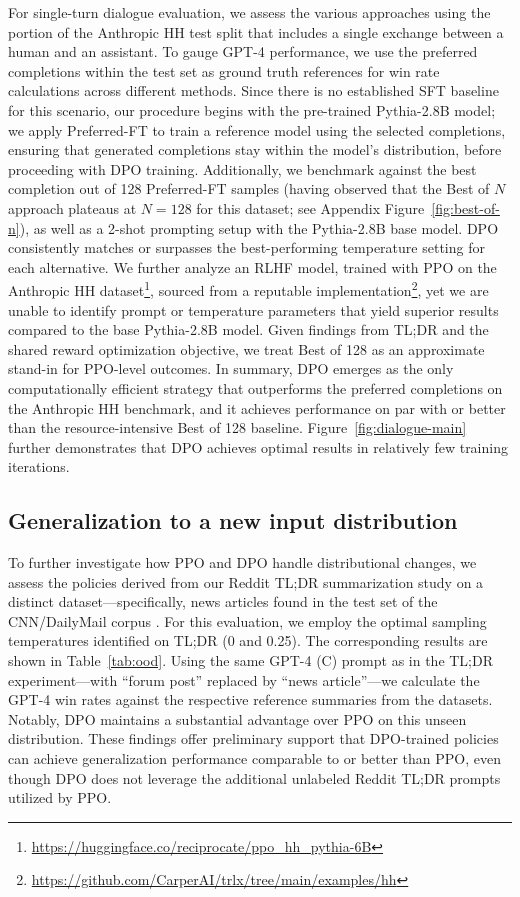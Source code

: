 For single-turn dialogue evaluation, we assess the various approaches using the portion of the Anthropic HH test split \citep{bai2022training} that includes a single exchange between a human and an assistant. To gauge GPT-4 performance, we use the preferred completions within the test set as ground truth references for win rate calculations across different methods. Since there is no established SFT baseline for this scenario, our procedure begins with the pre-trained Pythia-2.8B model; we apply Preferred-FT to train a reference model using the selected completions, ensuring that generated completions stay within the model’s distribution, before proceeding with DPO training. Additionally, we benchmark against the best completion out of 128 Preferred-FT samples (having observed that the Best of $N$ approach plateaus at $N=128$ for this dataset; see Appendix Figure~\ref{fig:best-of-n}), as well as a 2-shot prompting setup with the Pythia-2.8B base model. DPO consistently matches or surpasses the best-performing temperature setting for each alternative. We further analyze an RLHF model, trained with PPO on the Anthropic HH dataset\footnote{\url{https://huggingface.co/reciprocate/ppo_hh_pythia-6B}}, sourced from a reputable implementation\footnote{\url{https://github.com/CarperAI/trlx/tree/main/examples/hh}}, yet we are unable to identify prompt or temperature parameters that yield superior results compared to the base Pythia-2.8B model. Given findings from TL;DR and the shared reward optimization objective, we treat Best of 128 as an approximate stand-in for PPO-level outcomes. In summary, DPO emerges as the only computationally efficient strategy that outperforms the preferred completions on the Anthropic HH benchmark, and it achieves performance on par with or better than the resource-intensive Best of 128 baseline. Figure~\ref{fig:dialogue-main} further demonstrates that DPO achieves optimal results in relatively few training iterations.

\subsection{Generalization to a new input distribution}

To further investigate how PPO and DPO handle distributional changes, we assess the policies derived from our Reddit TL;DR summarization study on a distinct dataset—specifically, news articles found in the test set of the CNN/DailyMail corpus \citep{nallapati-etal-2016-abstractive}. For this evaluation, we employ the optimal sampling temperatures identified on TL;DR (0 and 0.25). The corresponding results are shown in Table~\ref{tab:ood}. Using the same GPT-4 (C) prompt as in the TL;DR experiment—with ``forum post'' replaced by ``news article''—we calculate the GPT-4 win rates against the respective reference summaries from the datasets. Notably, DPO maintains a substantial advantage over PPO on this unseen distribution. These findings offer preliminary support that DPO-trained policies can achieve generalization performance comparable to or better than PPO, even though DPO does not leverage the additional unlabeled Reddit TL;DR prompts utilized by PPO.

